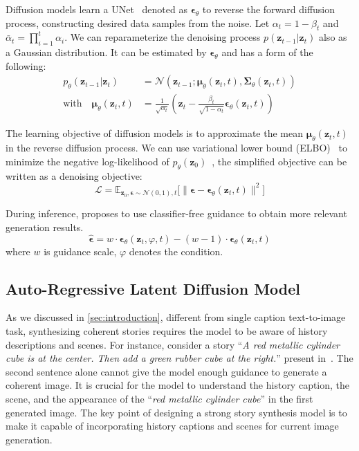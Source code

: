 \documentclass[10pt,twocolumn,letterpaper]{article}
\begin{document}
Diffusion models learn a UNet~\cite{unet} denoted as $\boldsymbol{\epsilon}_{\theta}$ to reverse the forward diffusion process, constructing desired data samples from the noise. Let $\alpha_t = 1-\beta_t$ and $\bar{\alpha}_t = \prod_{i=1}^t \alpha_i$. We can reparameterize the denoising process $p(\mathbf{z}_{t-1} \vert \mathbf{z}_t)$ also as a Gaussian distribution. It can be estimated by $\boldsymbol{\epsilon}_{\theta}$ and has a form of the following:
\begin{equation}
\begin{aligned}
p_\theta(\mathbf{z}_{t-1} \vert \mathbf{z}_t) &= \mathcal{N}(\mathbf{z}_{t-1}; \boldsymbol{\mu}_\theta(\mathbf{z}_t, t), \boldsymbol{\Sigma}_\theta(\mathbf{z}_t, t))  \\
\text{with} \quad \boldsymbol{\mu}_\theta(\mathbf{z}_t, t) &= \frac{1}{\sqrt{\alpha_t}} (\mathbf{z}_t - \frac{\beta_t}{\sqrt{1 - \bar{\alpha_t}}}\boldsymbol{\epsilon}_{\theta}(\mathbf{z}_t, t) )
\end{aligned}
\end{equation}

The learning objective of diffusion models is to approximate the mean $\boldsymbol{\mu}_\theta(\mathbf{z}_t, t)$ in the reverse diffusion process. We can use variational lower bound (ELBO)~\cite{vae} to minimize the negative log-likelihood of $p_\theta(\mathbf{z}_{0})$~\cite{ddpm}, the simplified objective can be written as a denoising objective:
\begin{equation}
\mathcal{L} = \mathbb{E}_{\mathbf{z}_0, \boldsymbol{\epsilon} \sim \mathcal{N}(0, 1), t} \Big[\|\boldsymbol{\epsilon} - \boldsymbol{\epsilon}_\theta(\mathbf{z}_t, t)\|^2 \Big]
\label{eq:objective}
\end{equation}


During inference, \cite{classifierfree} proposes to use classifier-free guidance to obtain more relevant generation results.
\begin{equation}
    \hat{\boldsymbol{\epsilon}} = w\cdot \boldsymbol{\epsilon}_{\theta}(\mathbf{z}_t, \varphi, t)-(w-1)\cdot\boldsymbol{\epsilon}_{\theta}(\mathbf{z}_t, t)
\end{equation}
where $w$ is guidance scale, $\varphi$ denotes the condition.


\subsection{Auto-Regressive Latent Diffusion Model}
As we discussed in \cref{sec:introduction}, different from single caption text-to-image task, synthesizing coherent stories requires the model to be aware of history descriptions and scenes. For instance, consider a story ``\textit{A red metallic cylinder cube is at the center. Then add a green rubber cube at the right.}'' present in~\cite{storygan}. The second sentence alone cannot give the model enough guidance to generate a coherent image. It is crucial for the model to understand the history caption, the scene, and the appearance of the ``\textit{red metallic cylinder cube}'' in the first generated image. The key point of designing a strong story synthesis model is to make it capable of incorporating history captions and scenes for current image generation.
\end{document}
